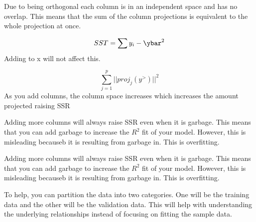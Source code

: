 \documentclass[12pt]{article}
\begin{document}
\begin{enumerate}
Due to being orthogonal each column is in an independent space and has no overlap. This means that the sum of the column projections is equivalent to the whole projection at once. 


$$SST = \sum{y_i - \ybar}^2$$
Adding to x will not affect this. 


$$\sum_{j=1}^p ||proj_j(y^>)||^2$$
As you add columns, the column space increases which increases the amount projected raising SSR



Adding more columns will always raise SSR even when it is garbage. This means that you can add garbage to increase the $R^2$ fit of your model. However, this is misleading becauseb it is resulting from garbage in. This is overfitting. 



Adding more columns will always raise SSR even when it is garbage. This means that you can add garbage to increase the $R^2$ fit of your model. However, this is misleading becauseb it is resulting from garbage in. This is overfitting. 


To help, you can partition the data into two categories. One will be the training data and the other will be the validation data. This will help with understanding the underlying relationships instead of focusing on fitting the sample data. 






\end{enumerate}
\end{document}
